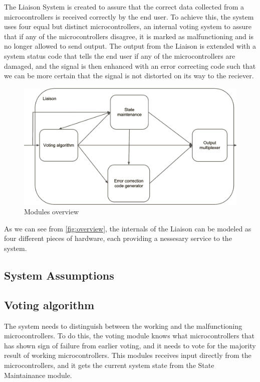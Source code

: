 \label{sec:design}
The Liaison System is created to assure that the correct data collected from a microcontrollers is received correctly by the end user.
To achieve this, the system uses four equal but distinct microcontrollers, an internal voting system to assure that if any of the microcontrollers
disagree, it is marked as malfunctioning and is no longer allowed to send output. The output from the Liaison is extended with a system status
code that tells the end user if any of the microcontrollers are damaged, and the signal is then enhanced with an error correcting code such that
we can be more certain that the signal is not distorted on its way to the reciever.

\begin{figure}[h]
\includegraphics[width=15cm]{design/fig_overview}
\caption{Modules overview}
\label{fig:overview}
\end{figure}

As we can see from \autoref{fig:overview}, the internals of the Liaison can be modeled as four different pieces of hardware, each providing a
nessesary service to the system.

\subsection{System Assumptions}


\subsection{Voting algorithm}
The system needs to distinguish between the working and the malfunctioning microcontrollers. To do this, the voting module knows what microcontrollers
that has shown sign of failure from earlier voting, and it needs to vote for the majority result of working microcontrollers. This modules
receives input directly from the microcontrollers, and it gets the current system state from the State Maintainance module.

